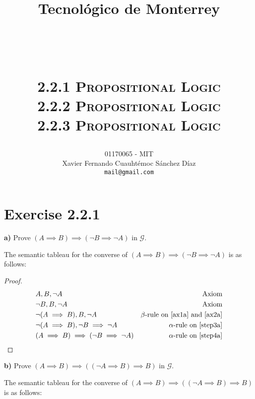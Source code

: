 \documentclass[titlepage, letterpaper, fleqn]{article}
\title{
\vspace{1in}
\textbf{Tecnológico de Monterrey} \\
\vspace{0.5in}
\textmd{\mahclass} \\
\large{\textit{\mahteacher}} \\
\vspace{0.5in}
\textsc{\mahtitle}\\
\textsc{2.2.1 Propositional Logic}\\
\textsc{2.2.2 Propositional Logic}\\
\textsc{2.2.3 Propositional Logic}\\
\author{01170065  - MIT \\
Xavier Fernando Cuauhtémoc Sánchez Díaz \\
\texttt{mail@gmail.com}}
\date{\mahdate}
}
\newcommand{\spacepls}{\vspace{5mm}}
\begin{document}
\begin{titlepage}
\maketitle
\end{titlepage}

%
%

\section{Exercise 2.2.1}

{\large \textbf{a)} Prove \((A \implies B) \implies (\neg B \implies \neg A)\) in \(\mathscr{G}\).}

The semantic tableau for the converse of \((A \implies B) \implies (\neg B \implies \neg A)\) is as follows:

\spacepls


\spacepls

\begin{proof}
\begin{align}
& A, B, \neg A & \text{Axiom} \label{ax1a}
\\ & \neg B, B, \neg A & \text{Axiom} \label{ax2a}
\\ & \neg(A \implies B), B, \neg A & \text{$\beta$-rule on \ref{ax1a} and \ref{ax2a}} \label{step3a}
\\ & \neg(A \implies B), \neg B \implies \neg A & \text{$\alpha$-rule on \ref{step3a}} \label{step4a}
\\ & (A \implies B) \implies (\neg B \implies \neg A) & \text{$\alpha$-rule on \ref{step4a}}
\end{align}
\end{proof}

{\large \textbf{b)} Prove \((A \implies B) \implies ((\neg A \implies B)\implies B)\) in \(\mathscr{G}\).}

The semantic tableau for the converse of \((A \implies B) \implies ((\neg A \implies B)\implies B)\) is as follows:
\end{document}
